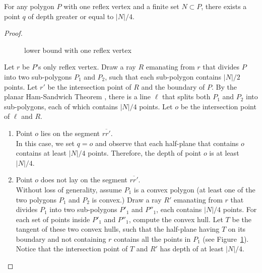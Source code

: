 \documentclass{article}
\begin{document}
\begin{clm} 
\label{cl:oneRef}
For any polygon $P$ with one reflex vertex and a finite set $N \subset P$, 
there exists a point $q$ of depth greater or equal to $|N|/4$. 
\end{clm}
%
\begin{proof}

\begin{figure}
   \begin{center}
   \end{center}
   \caption{lower bound with one reflex vertex}
 \label{fig:tan}
\end{figure}
Let $r$ be $P$'s only reflex vertex.
Draw a ray $R$ emanating from $r$ that divides $P$ 
into two sub-polygons $P_1$ and $P_2$, such that each sub-polygon contains $|N|/2$ points. 
Let $r'$ be the intersection point of $R$ and the boundary of $P$.
By the planar Ham-Sandwich Theorem \cite{ham}, there is a line $\ell$
that splits both $P_1$ and $P_2$ into sub-polygons, each of which contains $|N|/4$ points.
Let $o$ be the intersection point of $\ell$ and $R$.

\begin{enumerate}
\item Point $o$ lies on the segment $\overline{rr'}$. \\
In this case, we set $q=o$ and observe that
each half-plane that contains $o$ contains at least $|N|/4$ points. 
Therefore, the depth of point $o$ is at least $|N|/4$. 

\item Point $o$ does not lay on the segment $\overline{rr'}$. \\
Without loss of generality, assume $P_1$ is a convex polygon (at least one of the two polygons $P_1$ and $P_2$ is convex.)
Draw a ray $R'$ emanating from $r$ that divides $P_1$ 
into two sub-polygons $P'_1$ and $P''_1$, each contains $|N|/4$ points.
For each set of points inside $P'_1$ and $P''_1$, compute the convex hull.
Let $T$ be the tangent of these two convex hulls, such that the half-plane having $T$ on its boundary and not containing $r$ contains all the points in $P_1$ (see Figure~\ref{fig:tan}).
Notice that the intersection point of $T$ and $R'$ has depth of at least $|N|/4$.
 
\end{enumerate} 

\end{proof}
\end{document}

